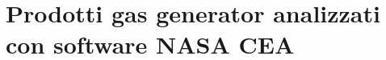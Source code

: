 \section{Prodotti gas generator analizzati con software NASA CEA}
\label{appendix:prodotti_gas_generator}

